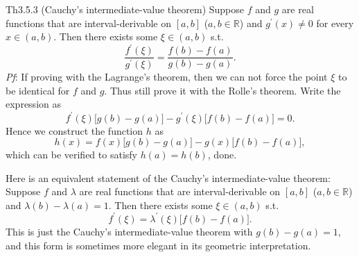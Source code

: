 \documentclass{article}
\begin{document}
\begin{Th}{Th3.5.3 (Cauchy's intermediate-value theorem)}
    Suppose $f$ and $g$ are real functions that are interval-derivable on $[a,b]$ ($a,b\in\mathbb{R}$) and $g^\prime(x)\neq 0$ for every $x\in (a,b)$. Then there exists some $\xi\in (a,b)$ s.t.
    $$ \frac{f^\prime(\xi)}{g^\prime(\xi)} = \frac{f(b)-f(a)}{g(b)-g(a)}. $$
    \tcblower
    \textit{Pf}: If proving with the Lagrange's theorem, then we can not force the point $\xi$ to be identical for $f$ and $g$. Thus still prove it with the Rolle's theorem. Write the expression as
    $$ f^\prime(\xi)\Big[g(b)-g(a)\Big] - g^\prime(\xi)\Big[f(b)-f(a)\Big] = 0. $$
    Hence we construct the function $h$ as
    $$ h(x) = f(x)\Big[g(b)-g(a)\Big] - g(x)\Big[f(b)-f(a)\Big], $$
    which can be verified to satisfy $h(a) = h(b)$, done.
\end{Th}

\begin{Rmk}{}
    Here is an equivalent statement of the Cauchy's intermediate-value theorem: \textcolor{Th}{Suppose $f$ and $\lambda$ are real functions that are interval-derivable on $[a,b]$ ($a,b\in\mathbb{R}$) and $\lambda(b)-\lambda(a) = 1$. Then there exists some $\xi\in (a,b)$ s.t. 
    $$ f^\prime(\xi) = \lambda^\prime(\xi)\Big[f(b)-f(a)\Big]. $$
    } This is just the Cauchy's intermediate-value theorem with $g(b) - g(a) = 1$, and this form is sometimes more elegant in its geometric interpretation.
\end{Rmk}
\end{document}
